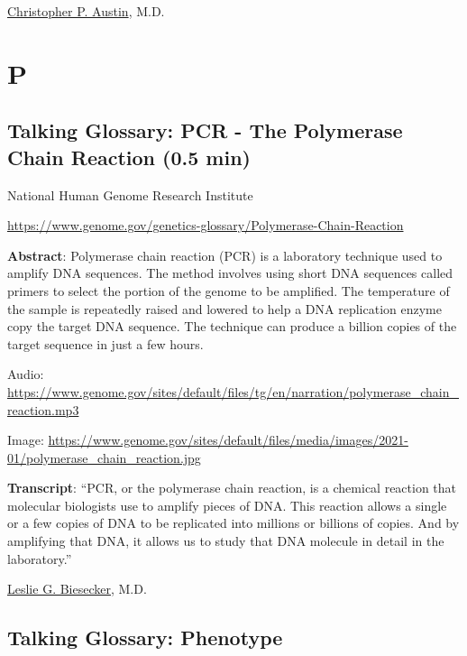 \documentclass[
]{book}
\begin{document}
\href{https://www.nih.gov/about-nih/who-we-are/nih-director/statements/nih-statement-departure-dr-christopher-austin}{Christopher P. Austin}, M.D.

\hypertarget{p}{%
\chapter{P}\label{p}}

\hypertarget{talking-glossary-pcr---the-polymerase-chain-reaction-0.5-min}{%
\section{Talking Glossary: PCR - The Polymerase Chain Reaction (0.5 min)}\label{talking-glossary-pcr---the-polymerase-chain-reaction-0.5-min}}

National Human Genome Research Institute

\url{https://www.genome.gov/genetics-glossary/Polymerase-Chain-Reaction}

\textbf{Abstract}: Polymerase chain reaction (PCR) is a laboratory technique used to amplify DNA sequences. The method involves using short DNA sequences called primers to select the portion of the genome to be amplified. The temperature of the sample is repeatedly raised and lowered to help a DNA replication enzyme copy the target DNA sequence. The technique can produce a billion copies of the target sequence in just a few hours.

Audio: \url{https://www.genome.gov/sites/default/files/tg/en/narration/polymerase_chain_reaction.mp3}

Image: \url{https://www.genome.gov/sites/default/files/media/images/2021-01/polymerase_chain_reaction.jpg}

\textbf{Transcript}: ``PCR, or the polymerase chain reaction, is a chemical reaction that molecular biologists use to amplify pieces of DNA. This reaction allows a single or a few copies of DNA to be replicated into millions or billions of copies. And by amplifying that DNA, it allows us to study that DNA molecule in detail in the laboratory.''

\href{https://www.genome.gov/staff/Leslie-G-Biesecker-MD}{Leslie G. Biesecker}, M.D.

\hypertarget{talking-glossary-phenotype}{%
\section{Talking Glossary: Phenotype}\label{talking-glossary-phenotype}}
\end{document}
